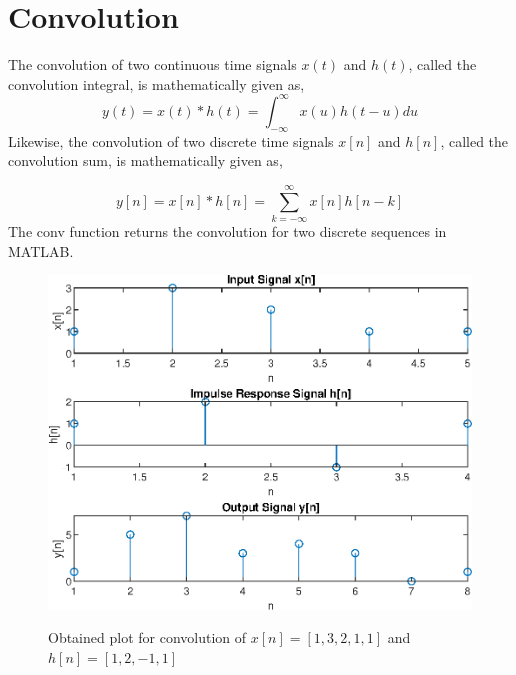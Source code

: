 \documentclass{lab_sheet}
\begin{document}
    \section{Convolution}
    The convolution of two continuous time signals $x(t)$ and $h(t)$, called the convolution integral, is mathematically given as,
    $$
    y(t)=x(t)*h(t)=\int_{-\infty}^{\infty}x(u)h(t-u)du
    $$
    Likewise, the convolution of two discrete time signals $x[n]$ and $h[n]$, called the convolution sum, is mathematically given as,

    $$
    y[n]=x[n]*h[n]=\sum_{k=-\infty}^{\infty} x[n]h[n-k]
    $$
    The conv function returns the convolution for two discrete sequences in MATLAB.
    \begin{figure}[H]
        \centering
        \includegraphics[scale=0.6]{./Figures/dis_convo}
        \label{fig:conv}
        \caption{Obtained plot for convolution of $x[n]=[1,3,2,1,1]$ and $h[n]=[1,2,-1,1]$}
    \end{figure}
\end{document}
